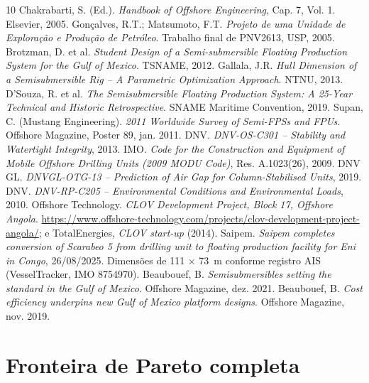 \documentclass[11pt,a4paper]{article}
\begin{document}
\begin{thebibliography}{10}
 Chakrabarti, S. (Ed.). \emph{Handbook of Offshore Engineering}, Cap. 7,
Vol. 1. Elsevier, 2005.
 Gonçalves, R.T.; Matsumoto, F.T. \emph{Projeto de uma Unidade de Exploração
e Produção de Petróleo}. Trabalho final de PNV2613, USP, 2005.
 Brotzman, D. et al. \emph{Student Design of a Semi-submersible Floating
Production System for the Gulf of Mexico}. TSNAME, 2012.
 Gallala, J.R. \emph{Hull Dimension of a Semisubmersible Rig -- A Parametric
Optimization Approach}. NTNU, 2013.
 D'Souza, R. et al. \emph{The Semisubmersible Floating Production System: A
25-Year Technical and Historic Retrospective}. SNAME Maritime Convention, 2019.
 Supan, C. (Mustang Engineering). \emph{2011 Worldwide Survey of Semi-FPSs and
FPUs}. Offshore Magazine, Poster 89, jan. 2011.
 DNV. \emph{DNV-OS-C301 -- Stability and Watertight Integrity}, 2013.
 IMO. \emph{Code for the Construction and Equipment of Mobile Offshore Drilling
Units (2009 MODU Code)}, Res. A.1023(26), 2009.
 DNV GL. \emph{DNVGL-OTG-13 -- Prediction of Air Gap for Column-Stabilised
Units}, 2019.
 DNV. \emph{DNV-RP-C205 -- Environmental Conditions and Environmental Loads}, 2010.
 Offshore Technology. \emph{CLOV Development Project, Block 17, Offshore Angola}.
\url{https://www.offshore-technology.com/projects/clov-development-project-angola/}; e TotalEnergies,
\emph{CLOV start-up} (2014).
 Saipem. \emph{Saipem completes conversion of Scarabeo 5 from drilling unit to
floating production facility for Eni in Congo}, 26/08/2025. Dimensões de 111 × 73~m conforme
registro AIS (VesselTracker, IMO 8754970).
 Beaubouef, B. \emph{Semisubmersibles setting the standard in the Gulf of
Mexico}. Offshore Magazine, dez. 2021.
 Beaubouef, B. \emph{Cost efficiency underpins new Gulf of Mexico platform
designs}. Offshore Magazine, nov. 2019.
\end{thebibliography}

\appendix
\section{Fronteira de Pareto completa}\label{ap:fronteira}
\end{document}
